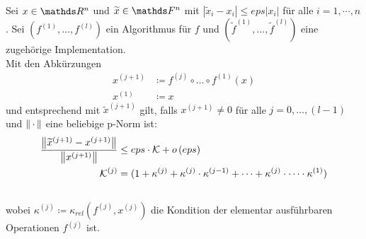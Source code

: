 \begin{Leme}[Fehlerfortpflanzung]
  \label{3.3.5} 
  Sei $x\in \Ren$ und $\widetilde{x}\in \F^n$ mit $|\widetilde{x}_i-x_i|\leq eps|x_i|$ für alle 
  $i=1,\cdots , n$.
  Sei $\left(f^{(1)},\dotsc ,f^{(l)}\right)$ ein Algorithmus für $f$ und 
  $(\widetilde{f}^{(1)},\dotsc ,\widetilde{f}^{(l)})$ eine zugehörige Implementation. \\
  Mit den Abkürzungen
  \begin{align*}
    x^{(j+1)} &\coloneqq f^{(j)}\circ \dotsc \circ f^{(1)}(x) \\
    x^{(1)} &\coloneqq x
  \end{align*}
  und entsprechend mit $\widetilde{x}^{(j+1)}$ gilt,
  falls $x^{(j+1)} \neq 0$ für alle $j=0,\dotsc , (l-1)$ und $\left\| \,\cdot\, \right\|$ eine beliebige p-Norm ist:
  \begin{align}
    \frac{\left\| \widetilde{x}^{(j+1)}-x^{(j+1)} \right\|}{\left\| x^{(j+1)} \right\|}
    &\leq eps \cdot \mathcal{K} + o\left(eps\right)
      \label{III.3.4} 
    \\ \nonumber
    \mathcal{K}^{(j)}&=(1+\kappa^{(j)}+\kappa^{(j)}\cdot \kappa^{(j-1)}+ \cdots + \kappa^{(j)}\cdot \dotsm \cdot \kappa^{(1)}) \\ \nonumber
  \end{align}
  wobei $	\kappa^{(j)} \coloneqq \kappa_{rel}(f^{(j)}, x^{(j)})$ die Kondition der elementar ausführbaren Operationen $f^{(j)}$ ist.
\end{Leme}

